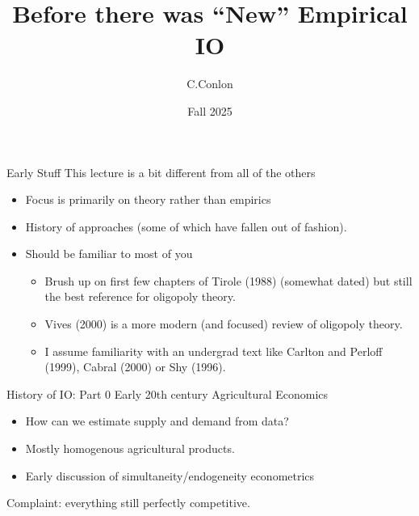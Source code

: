

\usepackage{tabularx}
\usepackage{dcolumn}
\usepackage{ragged2e}
\usepackage{multirow,multicol,dcolumn}



\title [``Old'' IO]{Before there was ``New'' Empirical IO}
\author{C.Conlon}
\date{Fall 2025}


\begin{frame}
\titlepage
\end{frame}

\begin{frame}{Early Stuff}
This lecture is a bit different from all of the others
\begin{itemize}
\item Focus is primarily on theory rather than empirics
\item History of approaches (some of which have fallen out of fashion).
\item Should be familiar to most of you
\begin{itemize}
\item Brush up on first few chapters of Tirole (1988) (somewhat dated) but still the best reference for oligopoly theory.
\item Vives (2000) is a more modern (and focused) review of oligopoly theory.
\item I assume familiarity with an undergrad text like Carlton and Perloff (1999), Cabral (2000) or Shy (1996).
\end{itemize}
\end{itemize}
\end{frame}

\begin{frame}{History of IO: Part 0}
Early 20th century Agricultural Economics
\begin{itemize}
\item How can we estimate supply and demand from data?
\item Mostly homogenous agricultural products.
\item Early discussion of simultaneity/endogeneity econometrics
\end{itemize}
Complaint: everything still perfectly competitive.
\end{frame}

